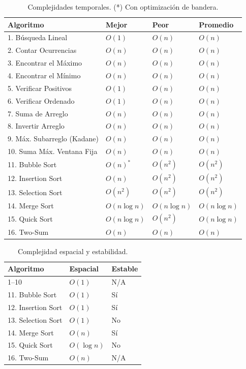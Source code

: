 \documentclass[11pt,a4paper]{article}
\begin{document}
\begin{table}[H]
\centering
\begin{tabular}{@{}llll@{}}
\toprule
\textbf{Algoritmo} & \textbf{Mejor} & \textbf{Peor} & \textbf{Promedio} \\
\midrule
1. Búsqueda Lineal & $O(1)$ & $O(n)$ & $O(n)$ \\
2. Contar Ocurrencias & $O(n)$ & $O(n)$ & $O(n)$ \\
3. Encontrar el Máximo & $O(n)$ & $O(n)$ & $O(n)$ \\
4. Encontrar el Mínimo & $O(n)$ & $O(n)$ & $O(n)$ \\
5. Verificar Positivos & $O(1)$ & $O(n)$ & $O(n)$ \\
6. Verificar Ordenado & $O(1)$ & $O(n)$ & $O(n)$ \\
7. Suma de Arreglo & $O(n)$ & $O(n)$ & $O(n)$ \\
8. Invertir Arreglo & $O(n)$ & $O(n)$ & $O(n)$ \\
9. Máx. Subarreglo (Kadane) & $O(n)$ & $O(n)$ & $O(n)$ \\
10. Suma Máx. Ventana Fija & $O(n)$ & $O(n)$ & $O(n)$ \\
11. Bubble Sort & $O(n)^*$ & $O(n^2)$ & $O(n^2)$ \\
12. Insertion Sort & $O(n)$ & $O(n^2)$ & $O(n^2)$ \\
13. Selection Sort & $O(n^2)$ & $O(n^2)$ & $O(n^2)$ \\
14. Merge Sort & $O(n \log n)$ & $O(n \log n)$ & $O(n \log n)$ \\
15. Quick Sort & $O(n \log n)$ & $O(n^2)$ & $O(n \log n)$ \\
16. Two-Sum & $O(n)$ & $O(n)$ & $O(n)$ \\
\bottomrule
\end{tabular}
\caption{Complejidades temporales. (*) Con optimización de bandera.}
\end{table}

\begin{table}[H]
\centering
\begin{tabular}{@{}lll@{}}
\toprule
\textbf{Algoritmo} & \textbf{Espacial} & \textbf{Estable} \\
\midrule
1--10 & $O(1)$ & N/A \\
11. Bubble Sort & $O(1)$ & Sí \\
12. Insertion Sort & $O(1)$ & Sí \\
13. Selection Sort & $O(1)$ & No \\
14. Merge Sort & $O(n)$ & Sí \\
15. Quick Sort & $O(\log n)$ & No \\
16. Two-Sum & $O(n)$ & N/A \\
\bottomrule
\end{tabular}
\caption{Complejidad espacial y estabilidad.}
\end{table}
\end{document}
